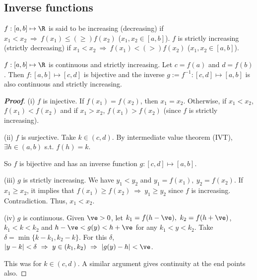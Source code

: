 \subsection{Inverse functions}

\begin{definition}\label{def:increasing_decreasing_funtion}
$f: [a,b]\mapsto \R$ is said to be increasing (decreasing) if $x_1<x_2 \ \Rightarrow \ f(x_1)\leq (\geq)f(x_2)$ ($x_1,x_2\in[a,b]$). $f$ is strictly increasing (strictly decreasing) if $x_1<x_2 \ \Rightarrow \ f(x_1) <(>) f(x_2)$ ($x_1,x_2\in[a,b]$).
\end{definition}

\begin{theorem}\label{thm:continuous_bijective_inverse_continuous}
$f: [a,b]\mapsto \R$ is continuous and strictly increasing. Let $c=f(a)$ and $d=f(b)$. Then $f: [a,b]\mapsto [c,d]$ is bijective and the inverse $g:=f^{-1}: [c,d]\mapsto [a,b]$ is also continuous and strictly increasing.
\end{theorem}

\begin{proof}[{\bf Proof}]
\ben
\item [(i)] $f$ is injective. If $f(x_1)=f(x_2)$, then $x_1=x_2$. Otherwise, if $x_1<x_2$, $f(x_1)<f(x_2)$ and if $x_1>x_2$, $f(x_1)>f(x_2)$ (since $f$ is strictly increasing).
\item [(ii)] $f$ is surjective. Take $k\in(c,d)$. By intermediate value theorem (IVT), $\exists h\in(a,b)$ s.t. $f(h)=k$.

So $f$ is bijective and has an inverse function $g: [c,d]\mapsto [a,b]$.

\item [(iii)] $g$ is strictly increasing. We have $y_1<y_2$ and $y_1=f(x_1), \ y_2=f(x_2)$. If $x_1\geq x_2$, it implies that $f(x_1)\geq f(x_2) \ \Rightarrow \ y_1\geq y_2$ since $f$ is increasing. Contradiction. Thus, $x_1 < x_2$.

\item [(iv)] $g$ is continuous. Given $\ve>0$, let $k_1=f(h-\ve),\ k_2=f(h+\ve)$, $k_1<k<k_2$ and $h-\ve < g(y) < h+\ve$ for any $k_1<y<k_2$. Take $\delta = \min\{k-k_1,k_2-k\}$. For this $\delta$, $|y-k|<\delta \ \Rightarrow \ y\in (k_1,k_2)\ \Rightarrow \ |g(y)-h|<\ve$.

This was for $k\in(c,d)$. A similar argument gives continuity at the end points also.
\een
\end{proof}


